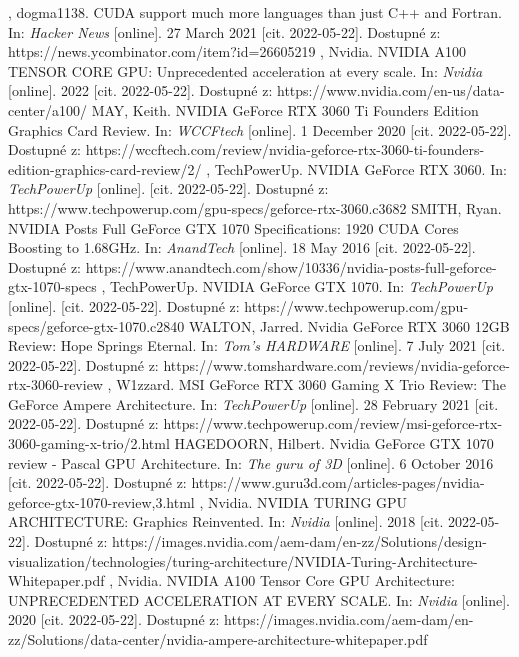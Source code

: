 \begin{thebibliography}{38}
	, dogma1138. CUDA support much more languages than just C++ and Fortran. In: \textit{Hacker News} [online]. 27 March 2021 [cit. 2022-05-22]. Dostupné z: https://news.ycombinator.com/item?id=26605219
	, Nvidia. NVIDIA A100 TENSOR CORE GPU: Unprecedented acceleration at every scale. In: \textit{Nvidia} [online]. 2022 [cit. 2022-05-22]. Dostupné z: https://www.nvidia.com/en-us/data-center/a100/
	MAY, Keith. NVIDIA GeForce RTX 3060 Ti Founders Edition Graphics Card Review. In: \textit{WCCFtech} [online]. 1 December 2020 [cit. 2022-05-22]. Dostupné z: https://wccftech.com/review/nvidia-geforce-rtx-3060-ti-founders-edition-graphics-card-review/2/
	, TechPowerUp. NVIDIA GeForce RTX 3060. In: \textit{TechPowerUp} [online]. [cit. 2022-05-22]. Dostupné z: https://www.techpowerup.com/gpu-specs/geforce-rtx-3060.c3682
	SMITH, Ryan. NVIDIA Posts Full GeForce GTX 1070 Specifications: 1920 CUDA Cores Boosting to 1.68GHz. In: \textit{AnandTech} [online]. 18 May 2016 [cit. 2022-05-22]. Dostupné z: https://www.anandtech.com/show/10336/nvidia-posts-full-geforce-gtx-1070-specs
	, TechPowerUp. NVIDIA GeForce GTX 1070. In: \textit{TechPowerUp} [online]. [cit. 2022-05-22]. Dostupné z: https://www.techpowerup.com/gpu-specs/geforce-gtx-1070.c2840
	WALTON, Jarred. Nvidia GeForce RTX 3060 12GB Review: Hope Springs Eternal. In: \textit{Tom's HARDWARE} [online]. 7 July 2021 [cit. 2022-05-22]. Dostupné z: https://www.tomshardware.com/reviews/nvidia-geforce-rtx-3060-review
	, W1zzard. MSI GeForce RTX 3060 Gaming X Trio Review: The GeForce Ampere Architecture. In: \textit{TechPowerUp} [online]. 28 February 2021 [cit. 2022-05-22]. Dostupné z: https://www.techpowerup.com/review/msi-geforce-rtx-3060-gaming-x-trio/2.html
	HAGEDOORN, Hilbert. Nvidia GeForce GTX 1070 review - Pascal GPU Architecture. In: \textit{The guru of 3D} [online]. 6 October 2016 [cit. 2022-05-22]. Dostupné z: https://www.guru3d.com/articles-pages/nvidia-geforce-gtx-1070-review,3.html
	, Nvidia. NVIDIA TURING GPU ARCHITECTURE: Graphics Reinvented. In: \textit{Nvidia} [online]. 2018 [cit. 2022-05-22]. Dostupné z: https://images.nvidia.com/aem-dam/en-zz/Solutions/design-visualization/technologies/turing-architecture/NVIDIA-Turing-Architecture-Whitepaper.pdf
	, Nvidia. NVIDIA A100 Tensor Core GPU Architecture: UNPRECEDENTED ACCELERATION AT EVERY SCALE. In: \textit{Nvidia} [online]. 2020 [cit. 2022-05-22]. Dostupné z: https://images.nvidia.com/aem-dam/en-zz/Solutions/data-center/nvidia-ampere-architecture-whitepaper.pdf

\end{thebibliography}
